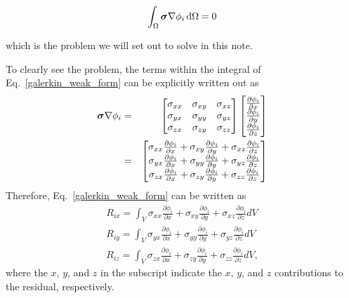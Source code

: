 %
\begin{equation}
\int_\Omega \bm{\sigma} \nabla \phi_i \mathop{}\!\mathrm{d} \Omega = 0
\label{galerkin_weak_form}
\end{equation}
%

which is the problem we will set out to solve in this note.

To clearly see the problem, the terms within the integral of Eq.\ \eqref{galerkin_weak_form} can be explicitly written out as
%
\begin{eqnarray}
\mat{\sigma} \nabla \phi_i &=&
\begin{bmatrix}
\sigma_{xx} & \sigma_{xy} & \sigma_{xz} \\
\sigma_{yx} & \sigma_{yy} & \sigma_{yz} \\
\sigma_{zx} & \sigma_{zy} & \sigma_{zz} 
\end{bmatrix}
%
\begin{bmatrix}
\frac{\partial \phi_i}{\partial x} \\ \frac{\partial \phi_i}{\partial y} \\ \frac{\partial \phi_i}{\partial z}
\end{bmatrix} \nonumber\\
%
&=& 
%
\begin{bmatrix}
\sigma_{xx} \frac{\partial \phi_i}{\partial x} + \sigma_{xy} \frac{\partial \phi_i}{\partial y} + \sigma_{xz} \frac{\partial \phi_i}{\partial z} \\
%
\sigma_{yx} \frac{\partial \phi_i}{\partial x} + \sigma_{yy} \frac{\partial \phi_i}{\partial y} + \sigma_{yz} \frac{\partial \phi_i}{\partial z} \\
%
\sigma_{zx} \frac{\partial \phi_i}{\partial x} + \sigma_{zy} \frac{\partial \phi_i}{\partial y} + \sigma_{zz} \frac{\partial \phi_i}{\partial z} 
\end{bmatrix}
%
\end{eqnarray}
%
Therefore, Eq.\ \eqref{galerkin_weak_form} can be written as
%
\begin{eqnarray}
R_{ix} = \int_V \sigma_{xx} \frac{\partial \phi_i}{\partial x} + \sigma_{xy} \frac{\partial \phi_i}{\partial y} + \sigma_{xz} \frac{\partial \phi_i}{\partial z} dV \nonumber\\
%
R_{iy} = \int_V \sigma_{yx} \frac{\partial \phi_i}{\partial x} + \sigma_{yy} \frac{\partial \phi_i}{\partial y} + \sigma_{yz} \frac{\partial \phi_i}{\partial z} dV \nonumber\\
%
R_{iz} = \int_V \sigma_{zx} \frac{\partial \phi_i}{\partial x} + \sigma_{zy} \frac{\partial \phi_i}{\partial y} + \sigma_{zz} \frac{\partial \phi_i}{\partial z}  dV,
\label{residual_xyz}
\end{eqnarray}
%
where the $x$, $y$, and $z$ in the subscript indicate the $x$, $y$, and $z$ contributions to the residual, respectively.


